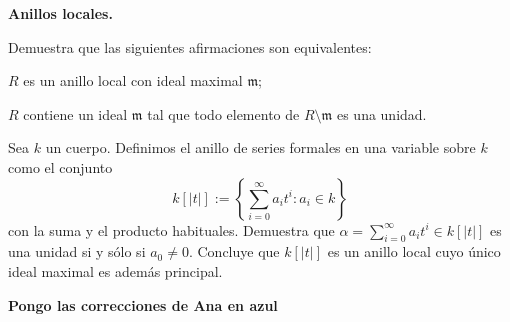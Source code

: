 \begin{problem}
{\bfseries Anillos locales.}

Demuestra que las siguientes afirmaciones son equivalentes:

\ppart $R$ es un anillo local con ideal maximal $\mathfrak m$;

\ppart $R$ contiene un ideal  $\mathfrak m$ tal que todo elemento de $R\setminus \mathfrak m$ es una unidad.
\solution
\end{problem}

\begin{problem}
Sea $k$ un cuerpo. Definimos el anillo de series formales en una variable sobre $k$ como el conjunto
$$k[|t|]:=\left\{\sum_{i=0}^{\infty}a_it^i: a_i\in k\right\}$$
con la suma y el producto habituales. Demuestra que $\alpha=\sum_{i=0}^{\infty}a_it^i
  \in k[|t|] $ es una unidad si y sólo si $a_0\neq 0$. Concluye que $k[|t|]$ es un anillo local cuyo único ideal maximal es además  principal.
\solution
\end{problem}

\noindent {}

\textbf{Pongo las correcciones de Ana en azul}

